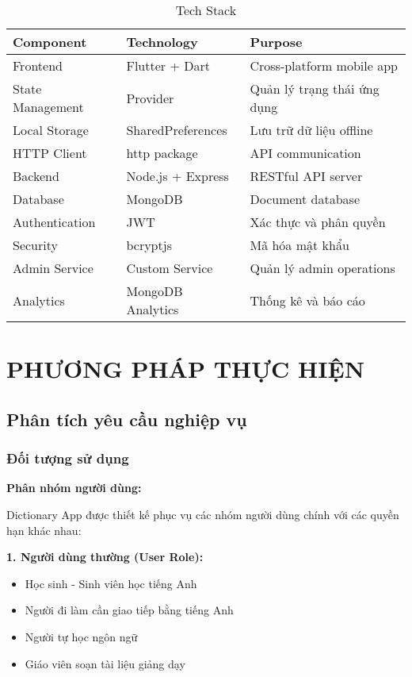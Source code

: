 \documentclass[12pt,a4paper]{article}
\begin{document}
\begin{table}[H]
\centering
\caption{Tech Stack}
\begin{tabular}{|l|l|l|}
\hline
\textbf{Component} & \textbf{Technology} & \textbf{Purpose} \\
\hline
Frontend & Flutter + Dart & Cross-platform mobile app \\
\hline
State Management & Provider & Quản lý trạng thái ứng dụng \\
\hline
Local Storage & SharedPreferences & Lưu trữ dữ liệu offline \\
\hline
HTTP Client & http package & API communication \\
\hline
Backend & Node.js + Express & RESTful API server \\
\hline
Database & MongoDB & Document database \\
\hline
Authentication & JWT & Xác thực và phân quyền \\
\hline
Security & bcryptjs & Mã hóa mật khẩu \\
\hline
Admin Service & Custom Service & Quản lý admin operations \\
\hline
Analytics & MongoDB Analytics & Thống kê và báo cáo \\
\hline
\end{tabular}
\end{table}

\section{PHƯƠNG PHÁP THỰC HIỆN}

\subsection{Phân tích yêu cầu nghiệp vụ}

\subsubsection{Đối tượng sử dụng}

\textbf{Phân nhóm người dùng:}

Dictionary App được thiết kế phục vụ các nhóm người dùng chính với các quyền hạn khác nhau:

\textbf{1. Người dùng thường (User Role):}
\begin{itemize}
    \item Học sinh - Sinh viên học tiếng Anh
    \item Người đi làm cần giao tiếp bằng tiếng Anh
    \item Người tự học ngôn ngữ
    \item Giáo viên soạn tài liệu giảng dạy
\end{itemize}
\end{document}
